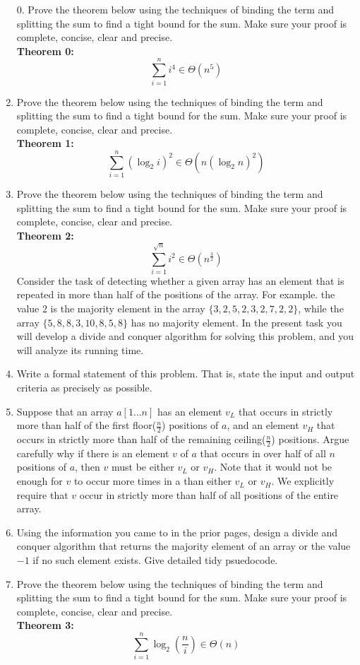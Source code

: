 \documentclass[12pt]{article}
\begin{document}
\begin{enumerate}
\item[0. ] Prove the theorem below using the techniques of binding the term and splitting the
sum to find a tight bound for the sum. Make sure your proof is complete, concise, clear
and precise.\\
\textbf{Theorem 0: }
$$\sum\limits_{i=1}^{n}i^4\in\Theta(n^5)$$
\newpage
\item Prove the theorem below using the techniques of binding the term and splitting the
sum to find a tight bound for the sum. Make sure your proof is complete, concise, clear
and precise.\\
\textbf{Theorem 1: }
$$\sum\limits_{i=1}^{n}(\log_2{i})^2\in\Theta(n(\log_2{n})^2)$$
\newpage
\item Prove the theorem below using the techniques of binding the term and splitting the
sum to find a tight bound for the sum. Make sure your proof is complete, concise, clear
and precise.\\
\textbf{Theorem 2: }
$$\sum\limits_{i=1}^{\sqrt{n}}i^2 \in\Theta(n^{\frac{3}{2}})$$
\newpage
Consider the task of detecting whether a given array has an element that is repeated in more
than half of the positions of the array. For example. the value 2 is the majority element in
the array $\{3, 2, 5, 2, 3, 2, 7, 2, 2\}$, while the array $\{5, 8, 8, 3, 10, 8, 5, 8\}$ has no majority element.
In the present task you will develop a divide and conquer algorithm for solving this problem,
and you will analyze its running time.\\
\item Write a formal statement of this problem. That is, state the input and
output criteria as precisely as possible.
\newpage
\item  Suppose that an array $a[1 \dots n]$ has an element $v_L$ that occurs in strictly more than half
of the first floor($\frac{n}{2}$) positions of $a$, and an element $v_H$ that occurs in strictly more than half
of the remaining ceiling($\frac{n}{2}$) positions. Argue carefully why if there is an element $v$ of $a$ that
occurs in over half of all $n$ positions of $a$, then $v$ must be either $v_L$ or $v_H$. Note that it
would not be enough for $v$ to occur more times in a than either $v_L$ or $v_H$. We explicitly
require that $v$ occur in strictly more than half of all positions of the entire array.
\newpage
\item Using the information you came to in the prior pages, design a divide and conquer algorithm 
that returns the majority element of an array or the value $-1$ if no such element exists. 
Give detailed tidy psuedocode.
\newpage
\item Prove the theorem below using the techniques of binding the term and splitting the
sum to find a tight bound for the sum. Make sure your proof is complete, concise, clear
and precise.\\
\textbf{Theorem 3: }
$$\sum\limits_{i=1}^{n}\log_2{(\frac{n}{i})}\in\Theta(n)$$
\end{enumerate}
\end{document}
